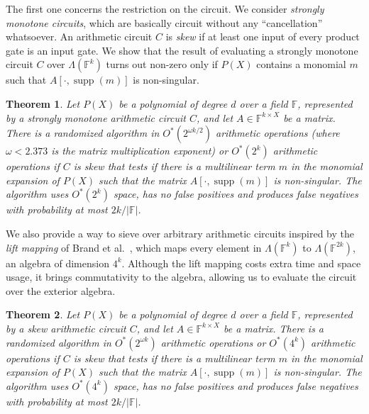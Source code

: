 \documentclass[10pt,a4paper]{article}
\newtheorem{theorem}{Theorem}[section]
\newcommand{\F}{\ensuremath{\mathbb F}\xspace}
\DeclareMathOperator{\supp}{supp}
\begin{document}
The first one concerns the restriction on the circuit.
We consider \emph{strongly monotone circuits}, which are basically circuit without any ``cancellation'' whatsoever.
An arithmetic circuit $C$ is \emph{skew} if at least one input of every product gate is an input gate.
We show that the result of evaluating a strongly monotone circuit $C$ over $\Lambda(\F^k)$ turns out non-zero only if $P(X)$ contains a monomial $m$ such that $A[\cdot, \supp(m)]$ is non-singular. 



\begin{theorem} \label{ithm:smonotone}
  Let $P(X)$ be a polynomial of degree $d$ over a field $\F$, represented by a strongly monotone arithmetic circuit $C$,
  and let $A \in \F^{k \times X}$ be a
  matrix. There is a randomized algorithm
  in $O^*(2^{\omega k / 2})$ arithmetic operations (where $\omega < 2.373$ is
  the matrix multiplication exponent) or $O^*(2^k)$ arithmetic operations if $C$ is skew that tests if there is a multilinear
  term $m$ in the monomial expansion of $P(X)$ such that the matrix
  $A[\cdot,\supp(m)]$ is non-singular.
  The algorithm uses $O^*(2^k)$ space, 
  has no false positives and produces false negatives with probability
  at most $2k/|\F|$.
\end{theorem}

We also provide a way to sieve over arbitrary arithmetic circuits inspired by the \emph{lift mapping} of Brand et al.~\cite{BrandDH18}, which maps every  element in $\Lambda(\F^k)$ to $\Lambda(\F^{2k})$, an algebra of dimension $4^k$. 
Although the lift mapping costs extra time and space usage, it brings commutativity to the algebra, allowing us to evaluate the circuit over the exterior algebra.

\begin{theorem} \label{ithm:general}
  Let $P(X)$ be a polynomial of degree $d$ over a field $\F$, represented by a skew arithmetic circuit $C$,
  and let $A \in \F^{k \times X}$ be a
  matrix. There is a randomized algorithm
  in $O^*(2^{\omega k})$ arithmetic operations or $O^*(4^k)$ arithmetic operations if $C$ is skew that tests if there is a multilinear
  term $m$ in the monomial expansion of $P(X)$ such that the matrix
  $A[\cdot,\supp(m)]$ is non-singular.
  The algorithm uses $O^*(4^k)$ space, 
  has no false positives and produces false negatives with probability
  at most $2k/|\F|$.
\end{theorem}
\end{document}
